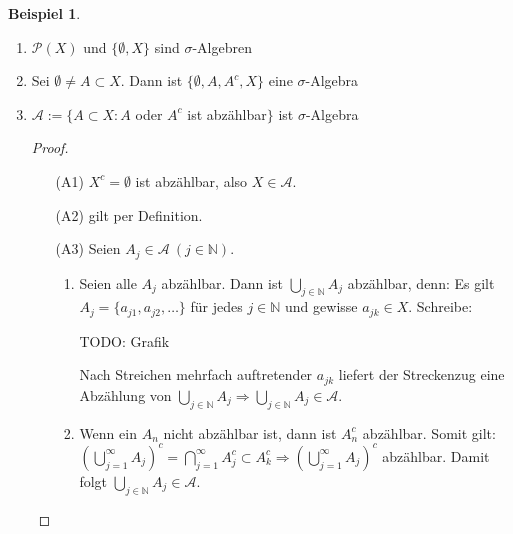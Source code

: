 \documentclass[a4paper]{report}
\newcommand{\PowerSet}{\mathcal{P}}
\newcommand{\N}{\mathbb{N}}
\newcommand{\jlabel}[1]{\label{j_#1}}
\theoremstyle{plain}
\theoremstyle{definition}
\newtheorem{expl}[thm]{Beispiel}
\begin{document}
\jlabel{Bsp 1.2}
\begin{expl}
    \begin{enumerate}
        \item $\PowerSet(X)$ und $\{\emptyset, X\}$ sind $\sigma$-Algebren
        \item Sei $\emptyset \ne A \subset X$. Dann ist $\{\emptyset, A, A^c, X\}$ eine $\sigma$-Algebra
        \item $\mathcal{A} := \{A \subset X : A$ oder $A^c$ ist abzählbar$\}$ ist $\sigma$-Algebra
            \begin{proof} 
                \begin{enumerate}
                    \item[(A1)] $X^c = \emptyset$ ist abzählbar, also $X \in \mathcal{A}$.
                    \item[(A2)] gilt per Definition.
                    \item[(A3)] Seien $A_j \in \mathcal{A} \ (j \in \N)$.
                        \begin{enumerate}
                            \item
                                Seien alle $A_j$ abzählbar. Dann ist $\bigcup_{j \in \N} A_j$ abzählbar, denn: Es gilt $A_j = \{a_{j1}, a_{j2}, \dots\}$      für jedes $j \in \N$ und gewisse $a_{jk} \in X$. Schreibe:
                                
                                \vspace{12pt}
                                
                                TODO: Grafik
                                
                                \vspace{12pt}
                            
                                Nach Streichen mehrfach auftretender $a_{jk}$ liefert der Streckenzug eine Abzählung von $\bigcup_{j \in \N} A_j \Rightarrow \bigcup_{j\in\N}A_j \in \mathcal{A}$.
                            \item
                                Wenn ein $A_n$ nicht abzählbar ist, dann ist $A_n^c$ abzählbar. Somit gilt:\\
                                $\left( \bigcup_{j=1}^\infty A_j \right)^c = \bigcap_{j=1}^\infty A_j^c \subset A_k^c \Rightarrow \left( \bigcup_{j=1}^\infty A_j \right)^c$ abzählbar. Damit folgt $\bigcup_{j \in\N} A_j \in \mathcal{A}$.
                        \end{enumerate}
                \end{enumerate}
            \end{proof}

    \end{enumerate}

\end{expl}
\end{document}
